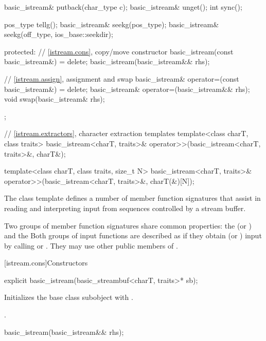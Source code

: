 \begin{codeblock}
{{    basic_istream& putback(char_type c);
    basic_istream& unget();
    int sync();

    pos_type tellg();
    basic_istream& seekg(pos_type);
    basic_istream& seekg(off_type, ios_base::seekdir);

  protected:
    // \ref{istream.cons}, copy/move constructor
    basic_istream(const basic_istream&) = delete;
    basic_istream(basic_istream&& rhs);

    // \ref{istream.assign}, assignment and swap
    basic_istream& operator=(const basic_istream&) = delete;
    basic_istream& operator=(basic_istream&& rhs);
    void swap(basic_istream& rhs);
  };

  // \ref{istream.extractors}, character extraction templates
  template<class charT, class traits>
    basic_istream<charT, traits>& operator>>(basic_istream<charT, traits>&, charT&);

  template<class charT, class traits, size_t N>
    basic_istream<charT, traits>& operator>>(basic_istream<charT, traits>&, charT(&)[N]);
}
\end{codeblock}

\pnum
The class template
defines a number of member function
signatures that assist in reading and interpreting input from sequences
controlled by a stream buffer.

\pnum
Two groups of member function signatures share common properties:
the
(or
)
and the
Both groups of input functions are described as if they obtain (or
)
input
by calling
or
.
They may use other public members of
.

[istream.cons]{Constructors}

%
\begin{itemdecl}
explicit basic_istream(basic_streambuf<charT, traits>* sb);
\end{itemdecl}

%
\begin{itemdescr}
\pnum
\effects
Initializes the base class subobject with
.

\pnum
\ensures
{}.
\end{itemdescr}


%
\begin{itemdecl}
basic_istream(basic_istream&& rhs);
\end{itemdecl}

